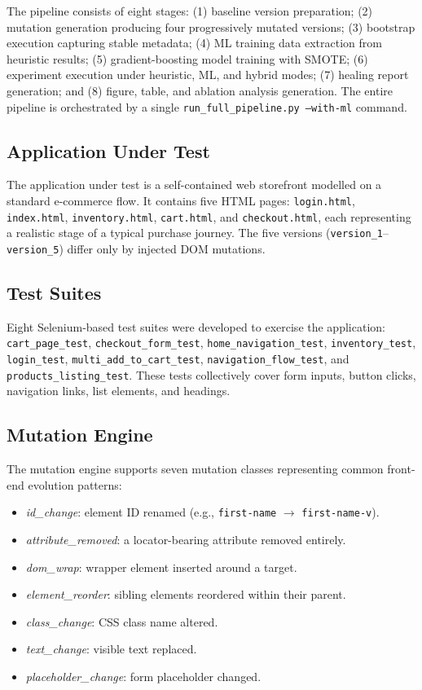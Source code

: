 \documentclass[12pt]{article}
\begin{document}
The pipeline consists of eight stages: (1) baseline version preparation; (2) mutation generation producing four progressively mutated versions; (3) bootstrap execution capturing stable metadata; (4) ML training data extraction from heuristic results; (5) gradient-boosting model training with SMOTE; (6) experiment execution under heuristic, ML, and hybrid modes; (7) healing report generation; and (8) figure, table, and ablation analysis generation. The entire pipeline is orchestrated by a single \texttt{run\_full\_pipeline.py --with-ml} command.

\subsection{Application Under Test}

The application under test is a self-contained web storefront modelled on a standard e-commerce flow. It contains five HTML pages: \texttt{login.html}, \texttt{index.html}, \texttt{inventory.html}, \texttt{cart.html}, and \texttt{checkout.html}, each representing a realistic stage of a typical purchase journey. The five versions (\texttt{version\_1}--\texttt{version\_5}) differ only by injected DOM mutations.

\subsection{Test Suites}

Eight Selenium-based test suites were developed to exercise the application: \texttt{cart\_page\_test}, \texttt{checkout\_form\_test}, \texttt{home\_navigation\_test}, \texttt{inventory\_test}, \texttt{login\_test}, \texttt{multi\_add\_to\_cart\_test}, \texttt{navigation\_flow\_test}, and \texttt{products\_listing\_test}. These tests collectively cover form inputs, button clicks, navigation links, list elements, and headings.

\subsection{Mutation Engine}

The mutation engine supports seven mutation classes representing common front-end evolution patterns:

\begin{itemize}[leftmargin=1.2em]
    \item \emph{id\_change}: element ID renamed (e.g., \texttt{first-name} $\to$ \texttt{first-name-v}).
    \item \emph{attribute\_removed}: a locator-bearing attribute removed entirely.
    \item \emph{dom\_wrap}: wrapper element inserted around a target.
    \item \emph{element\_reorder}: sibling elements reordered within their parent.
    \item \emph{class\_change}: CSS class name altered.
    \item \emph{text\_change}: visible text replaced.
    \item \emph{placeholder\_change}: form placeholder changed.
\end{itemize}
\end{document}
